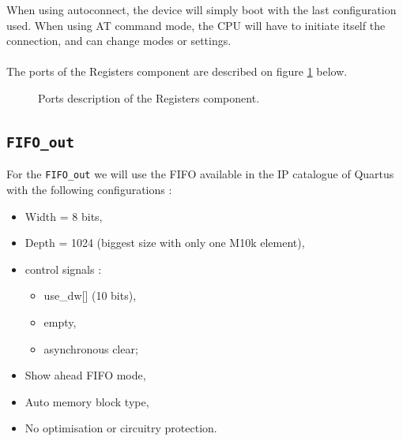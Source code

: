 \documentclass[11pt]{article}
\begin{document}
When using autoconnect, the device will simply boot with the last configuration used. When using AT command mode, the CPU will have to initiate itself the connection, and can change modes or settings.
\\\\
The ports of the Registers component are described on figure \ref{reg_ports} below.
\begin{figure}[H]
        \caption{Ports description of the Registers component.}
        \label{reg_ports}
\end{figure}

\subsection{\texttt{FIFO\_out}}
For the \texttt{FIFO\_out} we will use the FIFO available in the IP catalogue of Quartus with the following configurations :
\begin{itemize}
    \item Width = 8 bits,
    \item Depth = 1024 (biggest size with only one M10k element),
    \item control signals : \begin{itemize}
        \item use\_dw[] (10 bits),
        \item empty,
        \item asynchronous clear; \end{itemize}
    \item Show ahead FIFO mode,
    \item Auto memory block type,
    \item No optimisation or circuitry protection.
\end{itemize}
\end{document}
